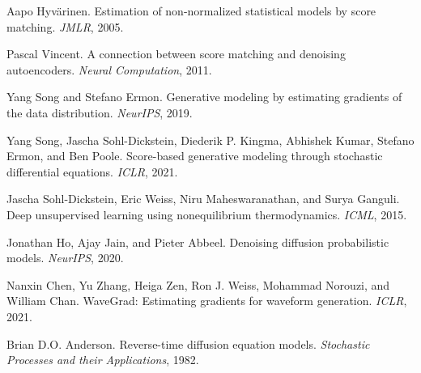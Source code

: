 \documentclass[11pt]{article}
\theoremstyle{definition}
\begin{document}

\begin{thebibliography}{10}

Aapo Hyv\"arinen.
\newblock Estimation of non-normalized statistical models by score matching.
\newblock \emph{JMLR}, 2005.

Pascal Vincent.
\newblock A connection between score matching and denoising autoencoders.
\newblock \emph{Neural Computation}, 2011.

Yang Song and Stefano Ermon.
\newblock Generative modeling by estimating gradients of the data distribution.
\newblock \emph{NeurIPS}, 2019.

Yang Song, Jascha Sohl-Dickstein, Diederik P. Kingma, Abhishek Kumar, Stefano Ermon, and Ben Poole.
\newblock Score-based generative modeling through stochastic differential equations.
\newblock \emph{ICLR}, 2021.

Jascha Sohl-Dickstein, Eric Weiss, Niru Maheswaranathan, and Surya Ganguli.
\newblock Deep unsupervised learning using nonequilibrium thermodynamics.
\newblock \emph{ICML}, 2015.

Jonathan Ho, Ajay Jain, and Pieter Abbeel.
\newblock Denoising diffusion probabilistic models.
\newblock \emph{NeurIPS}, 2020.

Nanxin Chen, Yu Zhang, Heiga Zen, Ron J. Weiss, Mohammad Norouzi, and William Chan.
\newblock WaveGrad: Estimating gradients for waveform generation.
\newblock \emph{ICLR}, 2021.

Brian D.O. Anderson.
\newblock Reverse-time diffusion equation models.
\newblock \emph{Stochastic Processes and their Applications}, 1982.

\end{thebibliography}
\end{document}
